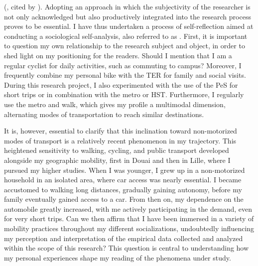 \begin{refsegment}
 (\textcolor{blue}{\textcite{perrault_jhabite_1965}}, cited by \textcolor{blue}{\textcite[181]{ducharme_ville_2021}}). Adopting an approach in which the subjectivity of the researcher is not only acknowledged but also productively integrated into the research process proves to be essential. I have thus undertaken a process of self-reflection aimed at conducting a sociological self-analysis, also referred to as . First, it is important to question my own relationship to the research subject and object, in order to shed light on my positioning for the readers. Should I mention that I am a regular cyclist for daily activities, such as commuting to campus? Moreover, I frequently combine my personal bike with the \acrfull{TER} for family and social visits. During this research project, I also experimented with the use of the \acrfull{PeS} for short trips or in combination with the metro or \acrfull{HST}. Furthermore, I regularly use the metro and walk, which gives my profile a multimodal dimension, alternating modes of transportation to reach similar destinations.%

It is, however, essential to clarify that this inclination toward non-motorized modes of transport is a relatively recent phenomenon in my trajectory. This heightened sensitivity to walking, cycling, and public transport developed alongside my geographic mobility, first in Douai and then in Lille, where I pursued my higher studies. When I was younger, I grew up in a non-motorized household in an isolated area, where car access was nearly essential. I became accustomed to walking long distances, gradually gaining autonomy, before my family eventually gained access to a car. From then on, my dependence on the automobile greatly increased, with me actively participating in the demand, even for very short trips. Can we then affirm that I have been immersed in a variety of mobility practices throughout my different socializations, undoubtedly influencing my perception and interpretation of the empirical data collected and analyzed within the scope of this research? This question is central to understanding how my personal experiences shape my reading of the phenomena under study.%


\end{refsegment}
